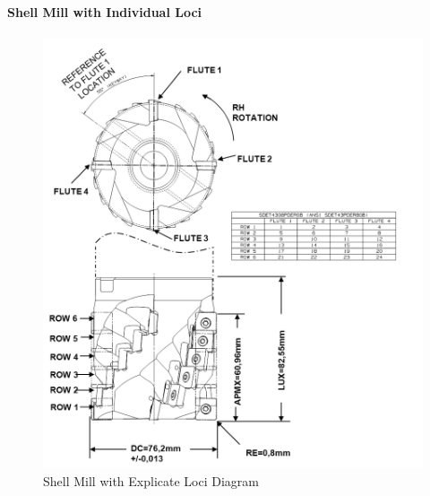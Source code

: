 \begin{lstlisting}[firstnumber=1,escapechar=|,% 
	caption={Example for Step Mill Side View}, label={lst:Example for Step Mill Side View}]
	\end{lstlisting}


\pagebreak

\paragraph{Shell Mill with Individual Loci}
\label{sec:Shell Mill with Individual Loci}

\begin{figure}[ht]
  \centering
    \includegraphics[width=1.0\textwidth]{figures/Shell Mill with Explicate Loci.png}
  \caption{Shell Mill with Explicate Loci Diagram}
  \label{fig:Shell Mill with Explicate Loci Diagram}
\end{figure}

\FloatBarrier


